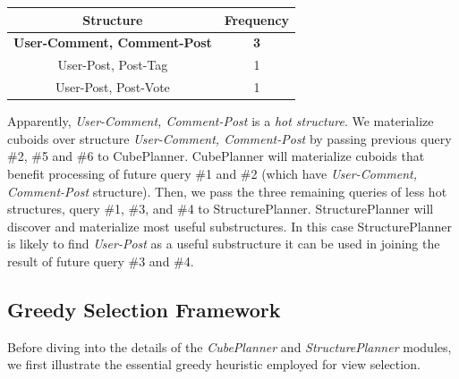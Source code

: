
\begin{center}
	\begin{tabular}{ | c | c |}
		\hline
		Structure	&Frequency	\\ \hline
		\textbf{User-Comment, Comment-Post} 	&\textbf{3} \\ \hline
		User-Post, Post-Tag 	&1 \\ \hline
		User-Post, Post-Vote	&1 \\ \hline
	\end{tabular}
	\end {center}
	
	Apparently,  \textit{User-Comment, Comment-Post} is a \emph{hot structure}. We materialize cuboids over structure \textit{User-Comment, Comment-Post} by passing previous query \#2, \#5 and \#6 to CubePlanner. CubePlanner will materialize cuboids that benefit processing of future query \#1 and \#2 (which have \textit{User-Comment, Comment-Post} structure). Then, we pass the three remaining queries of less hot structures, query \#1, \#3, and \#4 to StructurePlanner. StructurePlanner will discover and materialize most useful substructures. In this case StructurePlanner is likely to find \textit{User-Post} as a useful substructure it can be used in joining the result of future query \#3 and \#4.
	
	
	\subsection{Greedy Selection Framework}
	\label{s:Greedy Selection Framework}
	
	Before diving into the details of the \emph{CubePlanner} and \emph{StructurePlanner} modules, we first illustrate the essential greedy heuristic employed for view selection. %
	
